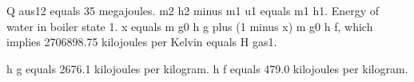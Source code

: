 Q aus12 equals 35 megajoules.
m2 h2 minus m1 u1 equals m1 h1.
Energy of water in boiler state 1.
x equals m g0 h g plus (1 minus x) m g0 h f, which implies 2706898.75 kilojoules per Kelvin equals H gas1.

h g equals 2676.1 kilojoules per kilogram.
h f equals 479.0 kilojoules per kilogram.